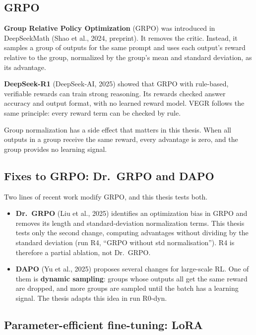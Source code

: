 \subsection{GRPO}\label{sec:2.5.2}

\textbf{Group Relative Policy Optimization} (GRPO) was introduced in
DeepSeekMath (Shao et al., 2024, preprint). It removes the critic.
Instead, it samples a group of outputs for the same prompt and uses each
output's reward relative to the group, normalized by the group's mean
and standard deviation, as its advantage.

\textbf{DeepSeek-R1} (DeepSeek-AI, 2025) showed that GRPO with
rule-based, verifiable rewards can train strong reasoning. Its rewards
checked answer accuracy and output format, with no learned reward model.
VEGR follows the same principle: every reward term can be checked by
rule.

Group normalization has a side effect that matters in this thesis. When
all outputs in a group receive the same reward, every advantage is zero,
and the group provides no learning signal.

\subsection{Fixes to GRPO: Dr.~GRPO and DAPO}\label{sec:2.5.3}

Two lines of recent work modify GRPO, and this thesis tests both.

\begin{itemize}
\tightlist
\item
  \textbf{Dr.~GRPO} (Liu et al., 2025) identifies an optimization bias
  in GRPO and removes its length and standard-deviation normalization
  terms. This thesis tests only the second change, computing advantages
  without dividing by the standard deviation (run R4, ``GRPO without std
  normalisation''). R4 is therefore a partial ablation, not Dr.~GRPO.
\item
  \textbf{DAPO} (Yu et al., 2025) proposes several changes for
  large-scale RL. One of them is \textbf{dynamic sampling}: groups whose
  outputs all get the same reward are dropped, and more groups are
  sampled until the batch has a learning signal. The thesis adapts this
  idea in run R0-dyn.
\end{itemize}

\subsection{Parameter-efficient fine-tuning: LoRA}\label{sec:2.5.4}

